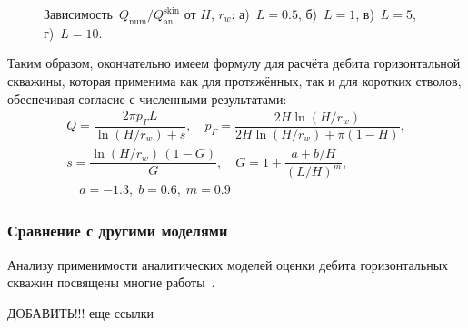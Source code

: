 \documentclass{article}
\begin{document}
\begin{figure}[H]
	\centering
	\begin{subfigure}{0.48\textwidth}
		
		\caption{}
		\label{fig:kham_hw_pipe_edge_effect_L0.5_r_approx}
	\end{subfigure}
	\hfill
	\begin{subfigure}{0.48\textwidth}
		
		\caption{}
		\label{fig:kham_hw_pipe_edge_effect_L1_r_approx}
	\end{subfigure}

	\begin{subfigure}{0.48\textwidth}
		
		\caption{}
		\label{fig:kham_hw_pipe_edge_effect_L5_r_approx}
	\end{subfigure}
	\hfill
	\begin{subfigure}{0.48\textwidth}
		
		\caption{}
		\label{fig:kham_hw_pipe_edge_effect_L10_r_approx}
	\end{subfigure}

	\caption{
		Зависимость~$Q_{\text{num}} / Q_{\text{an}}^{\text{skin}}$ от $H$, $r_w$: а)~$L=0.5$, б)~$L=1$, в)~$L=5$, г)~$L=10$.
	}
	\label{fig:kham_hw_pipe_edge_effects_r_approx}
\end{figure}

Таким образом, окончательно имеем формулу для расчёта дебита горизонтальной скважины,
которая применима как для протяжённых, так и для коротких стволов, обеспечивая согласие с численными результатами:
\begin{equation}
	\displaystyle
	\begin{gathered}
		Q = \dfrac{2 \pi p_{\Gamma} L}{\ln \left( H / r_w \right) + s}, \quad
		p_{\Gamma} = \dfrac{2 H \ln{\left(H/r_w\right)}}{2 H \ln{\left(H/r_w\right)
				+ \pi \left(1 - H\right)}}, \\[6pt] %
		s = \dfrac{\ln \left( H / r_w \right)\,\left(1 - G\right)}{G}, \quad
		G = 1 + \dfrac{a + b/H}{\left(L/H\right)^{m}}, \\ %
		\quad a=-1.3,\; b=0.6,\; m=0.9
	\end{gathered}
	\label{eq:hw_final_Q}
\end{equation}

\subsubsection{Сравнение с другими моделями}
Анализу применимости аналитических моделей оценки дебита горизонтальных скважин посвящены многие
работы~\cite{lit:kham_shubin2018,lit:kham_nasybullin2023}.
\begin{tcolorbox}[colback=yellow!20, colframe=black, coltitle=black, colbacktitle=yellow, title=\textbf{Предупреждение}]
	ДОБАВИТЬ!!! еще ссылки
\end{tcolorbox}
\end{document}
